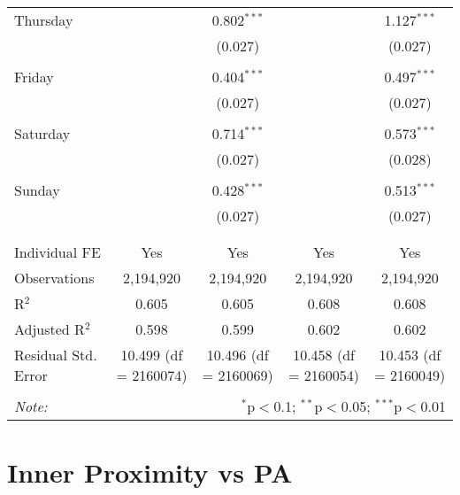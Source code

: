 \documentclass[
]{article}
\begin{document}
\begin{table}[!htbp]
{\begin{tabular}{@{\extracolsep{5pt}}lcccc}
 Thursday &  & 0.802$^{***}$ &  & 1.127$^{***}$ \\ 
  &  & (0.027) &  & (0.027) \\ 
  & & & & \\ 
 Friday &  & 0.404$^{***}$ &  & 0.497$^{***}$ \\ 
  &  & (0.027) &  & (0.027) \\ 
  & & & & \\ 
 Saturday &  & 0.714$^{***}$ &  & 0.573$^{***}$ \\ 
  &  & (0.027) &  & (0.028) \\ 
  & & & & \\ 
 Sunday &  & 0.428$^{***}$ &  & 0.513$^{***}$ \\ 
  &  & (0.027) &  & (0.027) \\ 
  & & & & \\ 
\hline \\[-1.8ex] 
Individual FE & Yes & Yes & Yes & Yes \\ 
Observations & 2,194,920 & 2,194,920 & 2,194,920 & 2,194,920 \\ 
R$^{2}$ & 0.605 & 0.605 & 0.608 & 0.608 \\ 
Adjusted R$^{2}$ & 0.598 & 0.599 & 0.602 & 0.602 \\ 
Residual Std. Error & 10.499 (df = 2160074) & 10.496 (df = 2160069) & 10.458 (df = 2160054) & 10.453 (df = 2160049) \\ 
\hline 
\hline \\[-1.8ex] 
\textit{Note:}  & \multicolumn{4}{r}{$^{*}$p$<$0.1; $^{**}$p$<$0.05; $^{***}$p$<$0.01} \\ 
\end{tabular}
} 
\end{table} 
\newpage
\section{Inner Proximity vs PA}
\end{document}
